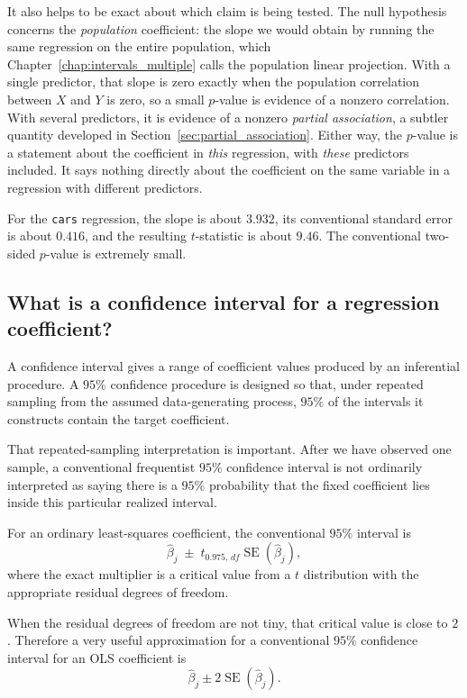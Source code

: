 \documentclass[11pt]{report}
\begin{document}
It also helps to be exact about which claim is being tested. The null hypothesis concerns the \emph{population} coefficient: the slope we would obtain by running the same regression on the entire population, which Chapter~\ref{chap:intervals_multiple} calls the population linear projection. With a single predictor, that slope is zero exactly when the population correlation between \(X\) and \(Y\) is zero, so a small \(p\)-value is evidence of a nonzero correlation. With several predictors, it is evidence of a nonzero \emph{partial association}, a subtler quantity developed in Section~\ref{sec:partial_association}. Either way, the \(p\)-value is a statement about the coefficient in \emph{this} regression, with \emph{these} predictors included. It says nothing directly about the coefficient on the same variable in a regression with different predictors.

For the \texttt{cars} regression, the slope is about \(3.932\), its conventional standard error is about \(0.416\), and the resulting \(t\)-statistic is about \(9.46\). The conventional two-sided \(p\)-value is extremely small.

\subsection{What is a confidence interval for a regression coefficient?}

A confidence interval gives a range of coefficient values produced by an inferential procedure. A \(95\%\) confidence procedure is designed so that, under repeated sampling from the assumed data-generating process, \(95\%\) of the intervals it constructs contain the target coefficient.

That repeated-sampling interpretation is important. After we have observed one sample, a conventional frequentist \(95\%\) confidence interval is not ordinarily interpreted as saying there is a \(95\%\) probability that the fixed coefficient lies inside this particular realized interval.

For an ordinary least-squares coefficient, the conventional \(95\%\) interval is
\[
\widehat{\beta}_j
\;\pm\;
 t_{0.975,\,df}
\operatorname{SE}(\widehat{\beta}_j),
\]
where the exact multiplier is a critical value from a \(t\) distribution with the appropriate residual degrees of freedom.

When the residual degrees of freedom are not tiny, that critical value is close to \(2\). Therefore a very useful approximation for a conventional \(95\%\) confidence interval for an OLS coefficient is
\[
\boxed{
\widehat{\beta}_j
\pm
2\operatorname{SE}(\widehat{\beta}_j).
}
\]
\end{document}
